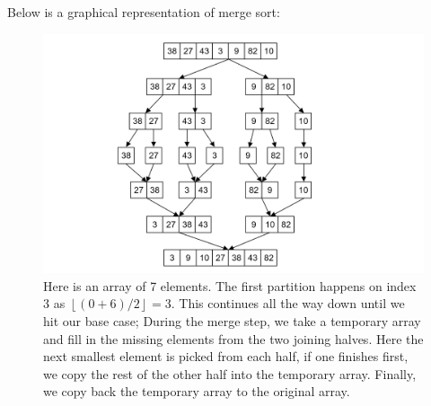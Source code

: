 \newpage 

\noindent
Below is a graphical representation of merge sort:
\begin{figure}[h]
    \hspace{-9em}
        \includegraphics[width=1.5\textwidth]{sections/recurs/mergesort.png}
        \caption{Here is an array of 7 elements. The first partition happens on index 3 as $\left\lfloor (0 + 6)/2 \right\rfloor = 3$. This continues all the way down until we hit our base case;
        During the merge step, we take a temporary array and fill in the missing elements from the two joining halves. Here the next smallest element is picked from 
        each half, if one finishes first, we copy the rest of the other half into the temporary array. Finally, we copy back the temporary array to the original array.}
\end{figure}


\newpage 

